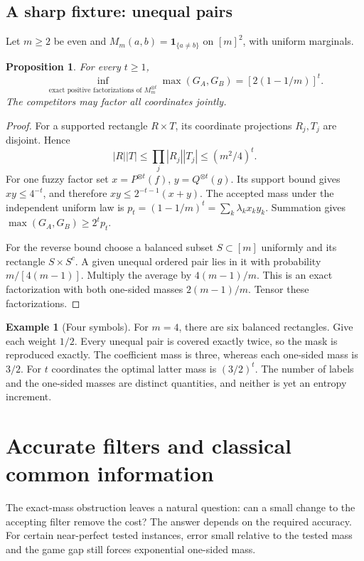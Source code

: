 \documentclass[11pt,reqno]{amsart}
\numberwithin{equation}{section}
\newtheorem{proposition}[theorem]{Proposition}
\theoremstyle{definition}
\newtheorem{example}[theorem]{Example}
\theoremstyle{remark}
\newcommand{\one}{\mathbf1}
\begin{document}
\subsection{A sharp fixture: unequal pairs}
Let \(m\ge2\) be even and \(M_m(a,b)=\one_{\{a\ne b\}}\) on \([m]^2\), with uniform marginals.
\begin{proposition}\label{prop:crown}
For every \(t\ge1\),
\[
 \inf_{\text{exact positive factorizations of }M_m^{\otimes t}}
       \max(G_A,G_B)=[2(1-1/m)]^t .
\]
The competitors may factor all coordinates jointly.
\end{proposition}
\begin{proof}
For a supported rectangle \(R\times T\), its coordinate projections \(R_j,T_j\) are disjoint. Hence
\[
 |R||T|\le\prod_j|R_j||T_j|\le(m^2/4)^t.
\]
For one fuzzy factor set \(x=P^{\otimes t}(f)\), \(y=Q^{\otimes t}(g)\). Its support bound gives \(xy\le4^{-t}\), and therefore
\(xy\le2^{-t-1}(x+y)\).
The accepted mass under the independent uniform law is \(p_t=(1-1/m)^t=\sum_k\lambda_kx_ky_k\). Summation gives
\(\max(G_A,G_B)\ge2^tp_t\).

For the reverse bound choose a balanced subset \(S\subset[m]\) uniformly and its rectangle \(S\times S^c\). A given unequal ordered pair lies in it with probability \(m/[4(m-1)]\). Multiply the average by \(4(m-1)/m\). This is an exact factorization with both one-sided masses \(2(m-1)/m\). Tensor these factorizations.
\end{proof}

\begin{example}[Four symbols]\label{ex:scatter}
For \(m=4\), there are six balanced rectangles. Give each weight \(1/2\). Every unequal pair is covered exactly twice, so the mask is reproduced exactly. The coefficient mass is three, whereas each one-sided mass is \(3/2\). For \(t\) coordinates the optimal latter mass is \((3/2)^t\). The number of labels and the one-sided masses are distinct quantities, and neither is yet an entropy increment.
\end{example}



\section{Accurate filters and classical common information}\label{sec:filters}
The exact-mass obstruction leaves a natural question: can a small change to the accepting filter remove the cost? The answer depends on the required accuracy. For certain near-perfect tested instances, error small relative to the tested mass and the game gap still forces exponential one-sided mass.
\end{document}
